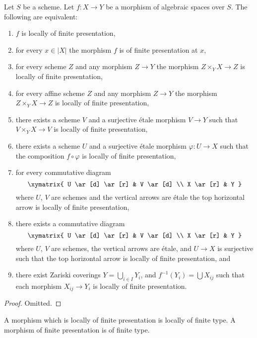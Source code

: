 \begin{lemma}
\label{lemma-finite-presentation-local}
Let $S$ be a scheme.
Let $f : X \to Y$ be a morphism of algebraic spaces over $S$.
The following are equivalent:
\begin{enumerate}
\item $f$ is locally of finite presentation,
\item for every $x \in |X|$ the morphism $f$ is of finite presentation at $x$,
\item for every scheme $Z$ and any morphism $Z \to Y$ the morphism
$Z \times_Y X \to Z$ is locally of finite presentation,
\item for every affine scheme $Z$ and any morphism
$Z \to Y$ the morphism $Z \times_Y X \to Z$ is locally of finite presentation,
\item there exists a scheme $V$ and a surjective \'etale morphism
$V \to Y$ such that $V \times_Y X \to V$ is
locally of finite presentation,
\item there exists a scheme $U$ and a surjective \'etale morphism
$\varphi : U \to X$ such that the composition $f \circ \varphi$
is locally of finite presentation,
\item for every commutative diagram
$$
\xymatrix{
U \ar[d] \ar[r] & V \ar[d] \\
X \ar[r] & Y
}
$$
where $U$, $V$ are schemes and the vertical arrows are \'etale
the top horizontal arrow is locally of finite presentation,
\item there exists a commutative diagram
$$
\xymatrix{
U \ar[d] \ar[r] & V \ar[d] \\
X \ar[r] & Y
}
$$
where $U$, $V$ are schemes, the vertical arrows are \'etale, and
$U \to X$ is surjective such that the top horizontal arrow is
locally of finite presentation, and
\item there exist Zariski coverings $Y = \bigcup_{i \in I} Y_i$,
and $f^{-1}(Y_i) = \bigcup X_{ij}$ such that
each morphism $X_{ij} \to Y_i$ is locally of finite presentation.
\end{enumerate}
\end{lemma}

\begin{proof}
Omitted.
\end{proof}

\begin{lemma}
\label{lemma-finite-presentation-finite-type}
A morphism which is locally of finite presentation is locally of finite type.
A morphism of finite presentation is of finite type.
\end{lemma}


